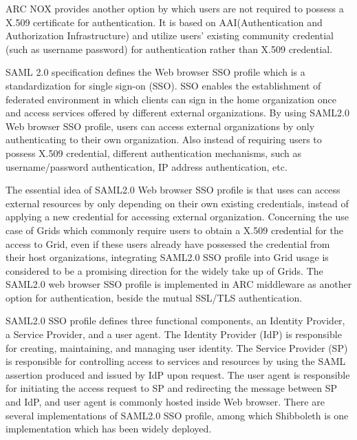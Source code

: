 \documentclass{article}                            %
\begin{document}
   ARC NOX provides another option by which users are not required to possess a X.509 certificate for authentication. It is based on AAI(Authentication and Authorization Infrastructure) and utilize users' existing community credential (such as username password) for authentication rather than X.509 credential.

   SAML 2.0 specification defines the Web browser SSO profile which is a standardization for single sign-on (SSO). SSO enables the establishment of federated environment in which clients can sign in the home organization once and access services offered by different external organizations. By using SAML2.0 Web browser SSO profile, users can access external organizations by only authenticating to their own organization. Also instead of requiring users to possess X.509 credential, different authentication mechanisms, such as username/password authentication, IP address authentication, etc.

  The essential idea of SAML2.0 Web browser SSO profile is that uses can access external resources by only depending on their own existing credentials, instead of applying a new credential for accessing external organization. Concerning the use case of Grids which commonly require users to obtain a X.509 credential for the access to Grid, even if these users already have possessed the credential from their host organizations, integrating SAML2.0 SSO profile into Grid usage is considered to be a promising direction for the widely take up of Grids. The SAML2.0 web browser SSO profile is implemented in ARC middleware as another option for authentication, beside the mutual SSL/TLS authentication.

  SAML2.0 SSO profile defines three functional components, an Identity Provider, a Service Provider, and a user agent. The Identity Provider (IdP) is responsible for creating, maintaining, and managing user identity.  The Service Provider (SP) is responsible for controlling access to services and resources by using the SAML assertion produced and issued by IdP upon request. The user agent is responsible for initiating the access request to SP and redirecting the message between SP and IdP, and user agent is commonly hosted inside Web browser. There are several implementations of SAML2.0 SSO profile, among which Shibboleth is one implementation which has been widely deployed.
\end{document}
